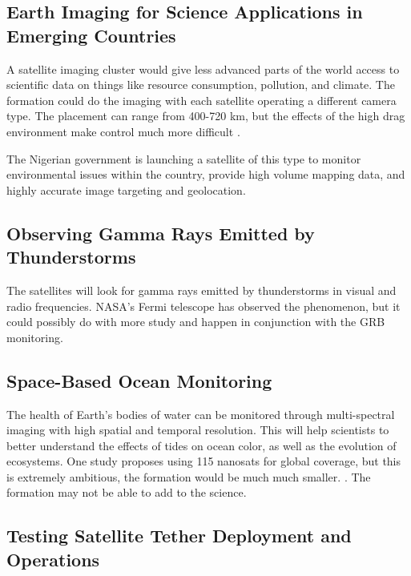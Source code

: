 \subsection{Earth Imaging for Science Applications in Emerging Countries}

A satellite imaging cluster would give less advanced parts of the world access to scientific data on things like resource consumption, pollution, and climate. The formation could do the imaging with each satellite operating a different camera type. The placement can range from 400-720 km, but the effects of the high drag environment make
control much more difficult\cite{Ref:Harrison} \cite{Ref:Atir} \cite{Ref:Herscovitz}\cite{Ref:Kalman}\cite{Ref:Kim}.

The Nigerian government is launching a satellite of this type to monitor environmental issues within the country, provide high volume mapping data, and highly accurate image targeting and geolocation\cite{Ref:Curiel}. 

\subsection{Observing Gamma Rays Emitted by Thunderstorms}

The satellites will look for gamma rays emitted by thunderstorms in visual and radio frequencies. NASA's Fermi telescope has observed the phenomenon, but it could possibly do with more study and happen in conjunction with the GRB monitoring.\cite{Ref:Fermi} \cite{Ref:Kitts}

\subsection{Space-Based Ocean Monitoring}

The health of Earth's bodies of water can be monitored through multi-spectral imaging with high spatial and temporal resolution. This will help scientists to better understand the effects of tides on ocean color, as well as the evolution of ecosystems. One study proposes using 115 nanosats for global coverage, but this is extremely ambitious, the formation would be much much smaller. \cite{Ref:Lowe}. The formation may not be able to add to the science.

\subsection{Testing Satellite Tether Deployment and Operations}

